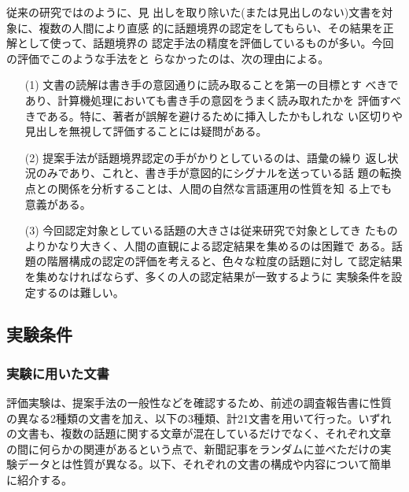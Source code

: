 従来の研究では\cite[など]{PACL-32-P9,NLC93-7,PNLP-2-P325}のように、見
出しを取り除いた(または見出しのない)文書を対象に、複数の人間により直感
的に話題境界の認定をしてもらい、その結果を正解として使って、話題境界の
認定手法の精度を評価しているものが多い。今回の評価でこのような手法をと
らなかったのは、次の理由による。

\begin{itemize}
\item[(1)] 文書の読解は書き手の意図通りに読み取ることを第一の目標とす
  べきであり、計算機処理においても書き手の意図をうまく読み取れたかを
  評価すべきである。特に、著者が誤解を避けるために挿入したかもしれな
  い区切りや見出しを無視して評価することには疑問がある。
\item[(2)] 提案手法が話題境界認定の手がかりとしているのは、語彙の繰り
  返し状況のみであり、これと、書き手が意図的にシグナルを送っている話
  題の転換点との関係を分析することは、人間の自然な言語運用の性質を知
  る上でも意義がある。
\item[(3)] 今回認定対象としている話題の大きさは従来研究で対象としてき
  たものよりかなり大きく、人間の直観による認定結果を集めるのは困難で
  ある。話題の階層構成の認定の評価を考えると、色々な粒度の話題に対し
  て認定結果を集めなければならず、多くの人の認定結果が一致するように
  実験条件を設定するのは難しい。
\end{itemize}

\subsection{実験条件}\label{sect:実験条件}

\subsubsection{実験に用いた文書}
\label{sect:実験対象文書}

評価実験は、提案手法の一般性などを確認するため、前述の調査報告書に性質
の異なる2種類の文書を加え、以下の3種類、計21文書を用いて行った。いずれ
の文書も、複数の話題に関する文章が混在しているだけでなく、それぞれ文章
の間に何らかの関連があるという点で、新聞記事をランダムに並べただけの実
験データとは性質が異なる。以下、それぞれの文書の構成や内容について簡単
に紹介する。


